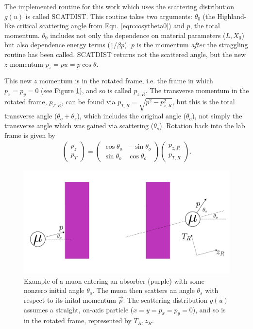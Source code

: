 The implemented routine for this work which uses the scattering distribution $g(u)$ is called SCATDIST. This routine takes two arguments: $\theta_0$ (the Highland-like critical scattering angle from Eqn. \ref{eqn:cosytheta0}) and $p$, the total momentum. $\theta_0$ includes not only the dependence on material parameters ($L, X_0$) but also dependence energy terms ($1/\beta p$). $p$ is the momentum \textit{after} the straggling routine has been called. SCATDIST returns not the scattered angle, but the new $z$ momentum $p_z=pu=p\cos\theta$. 

This new $z$ momentum is in the rotated frame, i.e. the frame in which $p_x=p_y=0$ (see Figure \ref{fig:cosyRotatedFrame}), and so is called $p_{z,R}$. The transverse momentum in the rotated frame, $p_{T,R}$, can be found via $p_{T,R}=\sqrt{p^2-p_{z,R}^2}$, but this is the total transverse angle ($\theta_o + \theta_s$), which includes the original angle ($\theta_o$), not simply the transverse angle which was gained via scattering ($\theta_s$). Rotation back into the lab frame is given by
\begin{align*}
\begin{pmatrix}
p_{z} \\ p_T
\end{pmatrix}
=
\begin{pmatrix}
\cos\theta_o & -\sin\theta_o\\
\sin\theta_o & \cos\theta_o
\end{pmatrix}
\begin{pmatrix}
p_{z,R} \\ p_{T,R}
\end{pmatrix}.
\end{align*}

\begin{figure}
  \centering
    \includegraphics[width=\textwidth]{Figures/cosyRotatedFrame} 
  \caption[Example of a muon entering an absorber with some nonzero initial angle.]{Example of a muon entering an absorber (purple) with some nonzero initial angle $\theta_o$. The muon then scatters an angle $\theta_s$ with respect to its inital momentum $\vec{p}$. The scattering distribution $g(u)$ assumes a straight, on-axis particle ($x=y=p_x=p_y=0$), and so is in the rotated frame, represented by $T_R, z_R$.}
  \label{fig:cosyRotatedFrame}
\end{figure}

